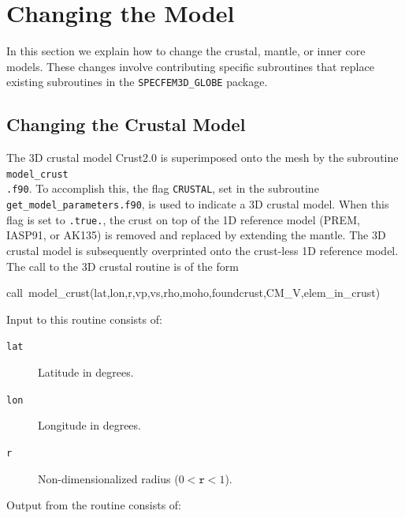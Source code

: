 \documentclass[oneside,english]{book}
\newenvironment{lyxcode}
{\begin{list}{}{
\setlength{\rightmargin}{\leftmargin}
\setlength{\listparindent}{0pt}%
\raggedright
\setlength{\itemsep}{0pt}
\setlength{\parsep}{0pt}
\normalfont\ttfamily}%
 \item[]}
{\end{list}}
\begin{document}
\chapter{{\normalsize \label{cha:-Changing-the}} Changing the Model}

In this section we explain how to change the crustal, mantle, or inner
core models. These changes involve contributing specific subroutines
that replace existing subroutines in the \texttt{SPECFEM3D\_GLOBE}
package.


\section{{\normalsize \label{sec:Changing-the-Crustal}}Changing the Crustal
Model}

The 3D crustal model Crust2.0 \citep{BaLaMa00} is superimposed onto
the mesh by the subroutine \texttt{model\_crust}~\\
\texttt{.f90}. To accomplish this, the flag \texttt{CRUSTAL}, set
in the subroutine \texttt{get\_model\_parameters.f90}, is used
to indicate a 3D crustal model. When this flag is set to \texttt{.true.},
the crust on top of the 1D reference model (PREM, IASP91, or AK135)
is removed and replaced by extending the mantle. The 3D crustal model
is subsequently overprinted onto the crust-less 1D reference model.
The call to the 3D crustal routine is of the form

\begin{lyxcode}
call~model\_crust(lat,lon,r,vp,vs,rho,moho,foundcrust,CM\_V,elem\_in\_crust)
\end{lyxcode}
Input to this routine consists of:

\begin{description}
\item [{\texttt{lat}}] Latitude in degrees.
\item [{\texttt{lon}}] Longitude in degrees.
\item [{\texttt{r}}] Non-dimensionalized radius ($0<\texttt{r}<1$).
\end{description}
Output from the routine consists of:
\end{document}

